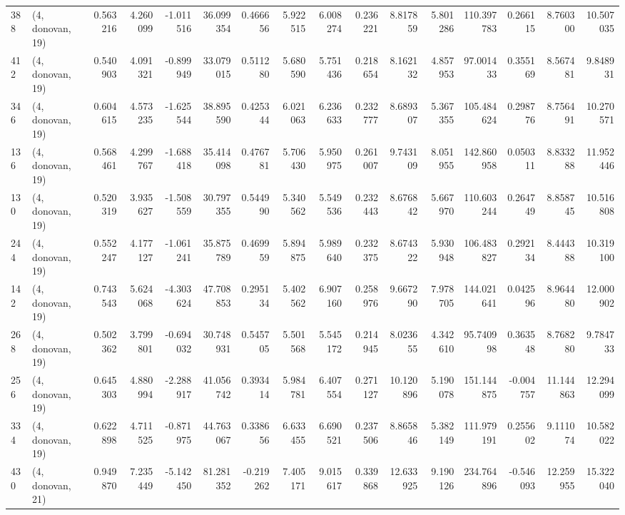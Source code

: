 \begin{tabular}{llrrrrrrrrrrrrrr}
388 &  (4, donovan, 19) &   0.563216 &   4.260099 &  -1.011516 &    36.099354 &   0.466656 &   5.922515 &   6.008274 &  0.236221 &   8.817859 &   5.801286 &   110.397783 &   0.266115 &   8.760300 &  10.507035 \\
412 &  (4, donovan, 19) &   0.540903 &   4.091321 &  -0.899949 &    33.079015 &   0.511280 &   5.680590 &   5.751436 &  0.218654 &   8.162132 &   4.857953 &    97.001433 &   0.355169 &   8.567481 &   9.848931 \\
346 &  (4, donovan, 19) &   0.604615 &   4.573235 &  -1.625544 &    38.895590 &   0.425344 &   6.021063 &   6.236633 &  0.232777 &   8.689307 &   5.367355 &   105.484624 &   0.298776 &   8.756491 &  10.270571 \\
136 &  (4, donovan, 19) &   0.568461 &   4.299767 &  -1.688418 &    35.414098 &   0.476781 &   5.706430 &   5.950975 &  0.261007 &   9.743109 &   8.051955 &   142.860958 &   0.050311 &   8.833288 &  11.952446 \\
130 &  (4, donovan, 19) &   0.520319 &   3.935627 &  -1.508559 &    30.797355 &   0.544990 &   5.340562 &   5.549536 &  0.232443 &   8.676842 &   5.667970 &   110.603244 &   0.264749 &   8.858745 &  10.516808 \\
244 &  (4, donovan, 19) &   0.552247 &   4.177127 &  -1.061241 &    35.875789 &   0.469959 &   5.894875 &   5.989640 &  0.232375 &   8.674322 &   5.930948 &   106.483827 &   0.292134 &   8.444388 &  10.319100 \\
142 &  (4, donovan, 19) &   0.743543 &   5.624068 &  -4.303624 &    47.708853 &   0.295134 &   5.402562 &   6.907160 &  0.258976 &   9.667290 &   7.978705 &   144.021641 &   0.042596 &   8.964480 &  12.000902 \\
268 &  (4, donovan, 19) &   0.502362 &   3.799801 &  -0.694032 &    30.748931 &   0.545705 &   5.501568 &   5.545172 &  0.214945 &   8.023655 &   4.342610 &    95.740998 &   0.363548 &   8.768280 &   9.784733 \\
256 &  (4, donovan, 19) &   0.645303 &   4.880994 &  -2.288917 &    41.056742 &   0.393414 &   5.984781 &   6.407554 &  0.271127 &  10.120896 &   5.190078 &   151.144875 &  -0.004757 &  11.144863 &  12.294099 \\
334 &  (4, donovan, 19) &   0.622898 &   4.711525 &  -0.871975 &    44.763067 &   0.338656 &   6.633455 &   6.690521 &  0.237506 &   8.865846 &   5.382149 &   111.979191 &   0.255602 &   9.111074 &  10.582022 \\
430 &  (4, donovan, 21) &   0.949870 &   7.235449 &  -5.142450 &    81.281352 &  -0.219262 &   7.405171 &   9.015617 &  0.339868 &  12.633925 &   9.190126 &   234.764896 &  -0.546093 &  12.259955 &  15.322040 \\

\end{tabular}
